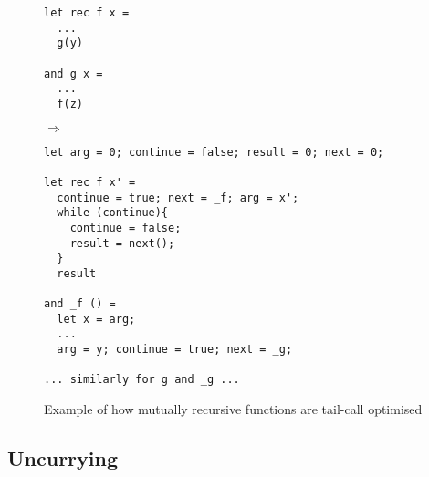 \begin{figure}[H]
\begin{minipage}{0.24\textwidth}
\begin{verbatim}
let rec f x = 
  ...
  g(y)

and g x = 
  ...
  f(z)
\end{verbatim}
\end{minipage}
 $\Longrightarrow$ \hfill
\begin{minipage}{0.65\textwidth}
\begin{verbatim}
let arg = 0; continue = false; result = 0; next = 0;

let rec f x' = 
  continue = true; next = _f; arg = x';
  while (continue){
    continue = false;
    result = next();
  }
  result

and _f () = 
  let x = arg;
  ...
  arg = y; continue = true; next = _g;

... similarly for g and _g ...
\end{verbatim}
\end{minipage}
\caption{Example of how mutually recursive functions are tail-call optimised}
\end{figure}




\subsection{Uncurrying}


